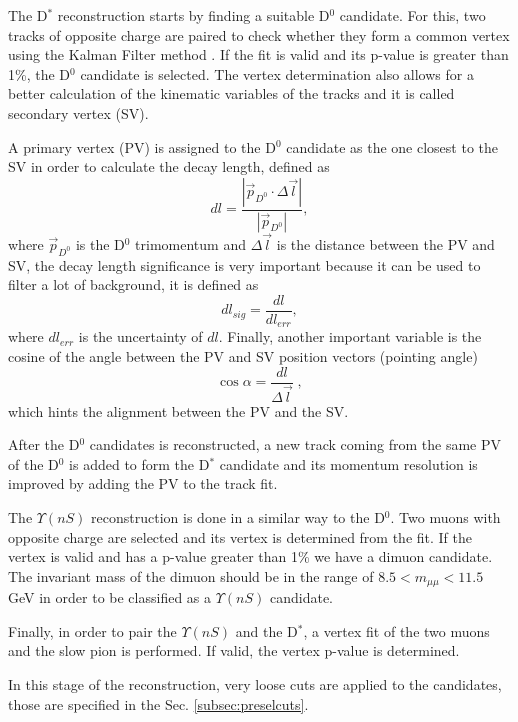 The D$^*$ reconstruction starts by finding a suitable D$^0$ candidate. For this, two tracks of opposite charge are paired to check whether they form a common vertex using the Kalman Filter method \cite{Fruhwirth:1991pm, Speer:927395}. If the fit is valid and its p-value is greater than 1\%, the D$^0$ candidate is selected. The vertex determination also allows for a better calculation of the kinematic variables of the tracks and it is called secondary vertex (SV).

A primary vertex (PV) is assigned to the D$^0$ candidate as the one closest to the SV in order to calculate the decay length, defined as
\begin{equation}
  dl = \frac{|\Vec{p}_{D^0} \cdot \Delta\Vec{l}|}{|\Vec{p}_{D^0}|},
\end{equation}
where $\Vec{p}_{D^0}$ is the D$^0$ trimomentum and $\Delta\Vec{l}$ is the distance between the PV and SV, the decay length significance is very important because it can be used to filter a lot of background, it is defined as
\begin{equation}
  dl_{sig} = \frac{dl}{dl_{err}},
\end{equation}
where $dl_{err}$ is the uncertainty of $dl$. Finally, another important variable is the cosine of the angle between the PV and SV position vectors (pointing angle)
\begin{equation}
  \cos{\alpha} = \frac{dl}{\Delta\Vec{l}} \; ,
\end{equation}
which hints the alignment between the PV and the SV.

After the D$^0$ candidates is reconstructed, a new track coming from the same PV of the D$^0$ is added to form the D$^*$ candidate and its momentum resolution is improved by adding the PV to the track fit.

The $\Upsilon(nS)$ reconstruction is done in a similar way to the D$^0$. Two muons with opposite charge are selected and its vertex is determined from the fit. If the vertex is valid and has a p-value greater than 1\% we have a dimuon candidate. The invariant mass of the dimuon should be in the range of $8.5 < m_{\mu\mu} < 11.5$ GeV in order to be classified as a $\Upsilon(nS)$ candidate.

Finally, in order to pair the $\Upsilon(nS)$ and the D$^*$, a vertex fit of the two muons and the slow pion is performed. If valid, the vertex p-value is determined.

In this stage of the reconstruction, very loose cuts are applied to the candidates, those are specified in the Sec. \ref{subsec:preselcuts}.

